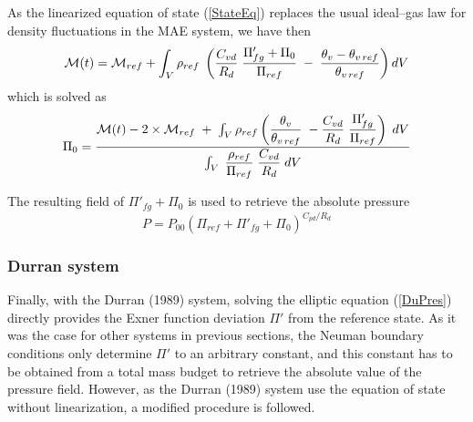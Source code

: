 
As the linearized equation of state (\ref{StateEq}) replaces the usual ideal--gas law
for density fluctuations in the MAE system, we have then
\begin{equation}
{\cal M}(t)  =    {\cal M}_{ref}  + \int _{V} \rho_{ref} \;  \left(
 \dfrac{C_{vd}}{R_d}
 \; \dfrac{\Pi '_{fg} +\Pi_{0} }{ \Pi_{ref}} \;
- \;  \dfrac{\theta_v -\theta_{v\,ref}}{\theta_{v\,ref}}
\right) dV
\end{equation}
which is solved as
\begin{equation}
\Pi_{0}   =  \dfrac{{\cal M}(t) - 2 \times {\cal M}_{ref}
 \; +  \; \int _{V} \rho_{ref}
\left( \dfrac{\theta_v}{\theta_{v\,ref}} \;  -  \dfrac{C_{vd}}{R_d}
 \; \dfrac{\Pi '_{fg}}{\Pi_{ref}}\right) \;  dV  }{ \int _{V} \;
 \dfrac{\rho_{ref}}{\Pi_{ref}}
 \;  \dfrac{C_{vd}}{R_d}  \;  dV }
\end{equation}

The resulting field of $\Pi '_{fg} + \Pi_0$ is used to retrieve the
absolute pressure
\begin{equation}
P= P_{00} \left(\Pi_{ref} + \Pi '_{fg} + \Pi_0 \right)^{C_{pd}/R_d}
\end{equation}

\subsubsection{Durran system}

Finally, with the Durran (1989) system, solving the elliptic equation (\ref{DuPres})
directly provides the Exner function deviation $\Pi '$ from the reference state.
As it was the case for other systems in previous sections, the Neuman boundary
conditions only determine $\Pi '$  to an arbitrary constant, and this constant has to be
obtained from a total mass budget to retrieve the absolute value of the pressure field.
However, as the Durran (1989) system use the equation of state without linearization, a
modified procedure is followed. \\

